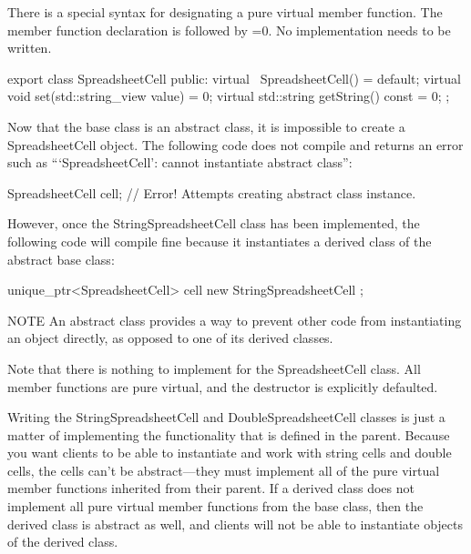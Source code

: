 There is a special syntax for designating a pure virtual member function. The member function declaration is followed by =0. No implementation needs to be written.

\begin{cpp}
export class SpreadsheetCell
{
    public:
        virtual ~SpreadsheetCell() = default;
        virtual void set(std::string_view value) = 0;
        virtual std::string getString() const = 0;
};
\end{cpp}

Now that the base class is an abstract class, it is impossible to create a SpreadsheetCell object. The following code does not compile and returns an error such as “‘SpreadsheetCell’: cannot instantiate abstract class”:

\begin{cpp}
SpreadsheetCell cell; // Error! Attempts creating abstract class instance.
\end{cpp}

However, once the StringSpreadsheetCell class has been implemented, the following code will compile fine because it instantiates a derived class of the abstract base class:

\begin{cpp}
unique_ptr<SpreadsheetCell> cell { new StringSpreadsheetCell {} };
\end{cpp}

\begin{myNotic}{NOTE}
An abstract class provides a way to prevent other code from instantiating an object directly, as opposed to one of its derived classes.
\end{myNotic}

Note that there is nothing to implement for the SpreadsheetCell class. All member functions are pure virtual, and the destructor is explicitly defaulted.


Writing the StringSpreadsheetCell and DoubleSpreadsheetCell classes is just a matter of implementing the functionality that is defined in the parent. Because you want clients to be able to instantiate and work with string cells and double cells, the cells can’t be abstract—they must implement all of the pure virtual member functions inherited from their parent. If a derived class does not implement all pure virtual member functions from the base class, then the derived class is abstract as well, and clients will not be able to instantiate objects of the derived class.

